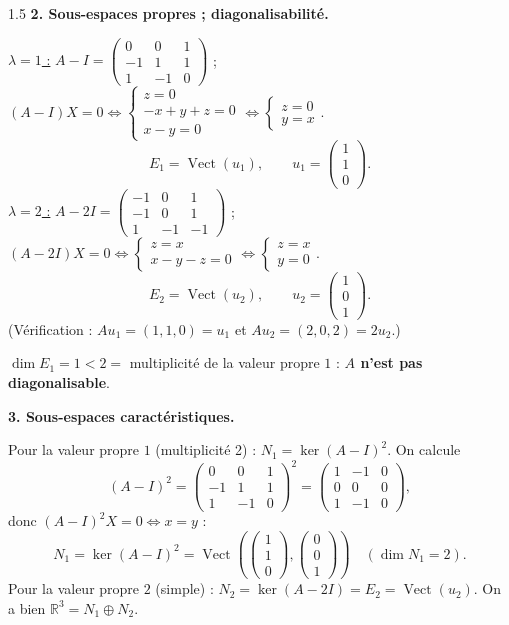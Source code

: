 \documentclass[12pt]{article}
\begin{document}
\begin{spacing}{1.5}
\textbf{2. Sous-espaces propres ; diagonalisabilité.}

\underline{$\lambda=1$ :} $A-I=\begin{pmatrix}0&0&1\\-1&1&1\\1&-1&0\end{pmatrix}$ ; $(A-I)X=0\iff\begin{cases}z=0\\-x+y+z=0\\x-y=0\end{cases}\iff\begin{cases}z=0\\y=x\end{cases}$.
\[
E_1=\operatorname{Vect}(u_1),\qquad u_1=\begin{pmatrix}1\\1\\0\end{pmatrix}.
\]
\underline{$\lambda=2$ :} $A-2I=\begin{pmatrix}-1&0&1\\-1&0&1\\1&-1&-1\end{pmatrix}$ ; $(A-2I)X=0\iff\begin{cases}z=x\\x-y-z=0\end{cases}\iff\begin{cases}z=x\\y=0\end{cases}$.
\[
E_2=\operatorname{Vect}(u_2),\qquad u_2=\begin{pmatrix}1\\0\\1\end{pmatrix}.
\]
(Vérification : $Au_1=(1,1,0)=u_1$ et $Au_2=(2,0,2)=2u_2$.)

$\dim E_1=1<2=$ multiplicité de la valeur propre $1$ : \textbf{$A$ n'est pas diagonalisable}.

\textbf{3. Sous-espaces caractéristiques.}

Pour la valeur propre $1$ (multiplicité 2) : $N_1=\ker(A-I)^2$. On calcule
\[
(A-I)^2=\begin{pmatrix}0&0&1\\-1&1&1\\1&-1&0\end{pmatrix}^2=\begin{pmatrix}1&-1&0\\0&0&0\\1&-1&0\end{pmatrix},
\]
donc $(A-I)^2X=0\iff x=y$ :
\[
N_1=\ker(A-I)^2=\operatorname{Vect}\left(\begin{pmatrix}1\\1\\0\end{pmatrix},\begin{pmatrix}0\\0\\1\end{pmatrix}\right)\quad(\dim N_1=2).
\]
Pour la valeur propre $2$ (simple) : $N_2=\ker(A-2I)=E_2=\operatorname{Vect}(u_2)$. On a bien $\mathbb{R}^3=N_1\oplus N_2$.


\end{spacing}
\end{document}
